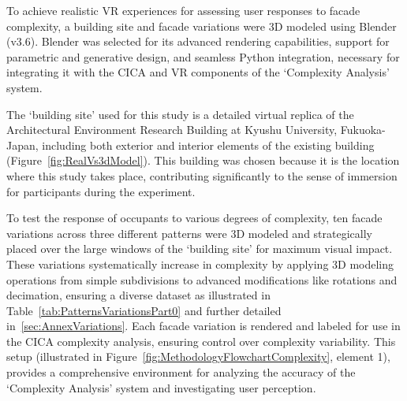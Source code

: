 %    



To achieve realistic VR experiences for assessing user responses to facade complexity, a building site and facade variations were 3D modeled using Blender (v3.6).
Blender was selected for its advanced rendering capabilities, support for parametric and generative design, and seamless Python integration, necessary for integrating it with the CICA and VR components of the `Complexity Analysis' system.

The `building site' used for this study is a detailed virtual replica of the Architectural Environment Research Building at Kyushu University, Fukuoka-Japan, including both exterior and interior elements of the existing building (Figure~\ref{fig:RealVs3dModel}). This building was chosen because it is the location where this study takes place, contributing significantly to the sense of immersion for participants during the experiment.

To test the response of occupants to various degrees of complexity, ten facade variations across three different patterns were 3D modeled and strategically placed over the large windows of the `building site' for maximum visual impact.
These variations systematically increase in complexity by applying 3D modeling operations from simple subdivisions to advanced modifications like rotations and decimation, ensuring a diverse dataset as illustrated in Table~\ref{tab:PatternsVariationsPart0} and further detailed in~\ref{sec:AnnexVariations}.
Each facade variation is rendered and labeled for use in the CICA complexity analysis, ensuring control over complexity variability.
This setup (illustrated in Figure~\ref{fig:MethodologyFlowchartComplexity}, element 1), provides a comprehensive environment for analyzing the accuracy of the `Complexity Analysis' system and investigating user perception.


